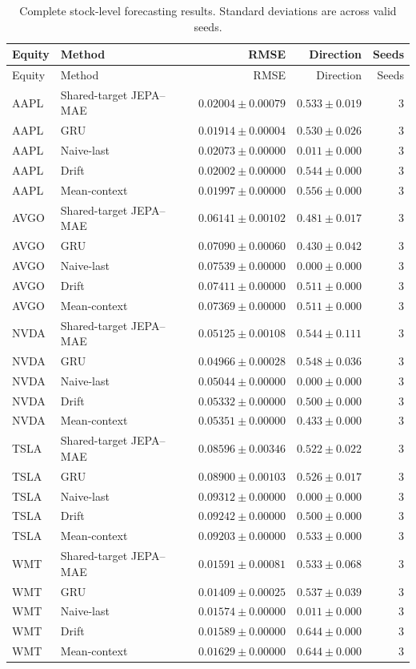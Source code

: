 \begin{longtable}{llrrr}
\caption{Complete stock-level forecasting results. Standard deviations are across valid seeds.}\label{tab:appendix_stock_metrics}\\
\toprule
Equity & Method & RMSE & Direction & Seeds \\
\midrule
\endfirsthead
\toprule
Equity & Method & RMSE & Direction & Seeds \\
\midrule
\endhead
AAPL & Shared-target JEPA--MAE & $0.02004 \pm 0.00079$ & $0.533 \pm 0.019$ & 3 \\
AAPL & GRU & $0.01914 \pm 0.00004$ & $0.530 \pm 0.026$ & 3 \\
AAPL & Naive-last & $0.02073 \pm 0.00000$ & $0.011 \pm 0.000$ & 3 \\
AAPL & Drift & $0.02002 \pm 0.00000$ & $0.544 \pm 0.000$ & 3 \\
AAPL & Mean-context & $0.01997 \pm 0.00000$ & $0.556 \pm 0.000$ & 3 \\
AVGO & Shared-target JEPA--MAE & $0.06141 \pm 0.00102$ & $0.481 \pm 0.017$ & 3 \\
AVGO & GRU & $0.07090 \pm 0.00060$ & $0.430 \pm 0.042$ & 3 \\
AVGO & Naive-last & $0.07539 \pm 0.00000$ & $0.000 \pm 0.000$ & 3 \\
AVGO & Drift & $0.07411 \pm 0.00000$ & $0.511 \pm 0.000$ & 3 \\
AVGO & Mean-context & $0.07369 \pm 0.00000$ & $0.511 \pm 0.000$ & 3 \\
NVDA & Shared-target JEPA--MAE & $0.05125 \pm 0.00108$ & $0.544 \pm 0.111$ & 3 \\
NVDA & GRU & $0.04966 \pm 0.00028$ & $0.548 \pm 0.036$ & 3 \\
NVDA & Naive-last & $0.05044 \pm 0.00000$ & $0.000 \pm 0.000$ & 3 \\
NVDA & Drift & $0.05332 \pm 0.00000$ & $0.500 \pm 0.000$ & 3 \\
NVDA & Mean-context & $0.05351 \pm 0.00000$ & $0.433 \pm 0.000$ & 3 \\
TSLA & Shared-target JEPA--MAE & $0.08596 \pm 0.00346$ & $0.522 \pm 0.022$ & 3 \\
TSLA & GRU & $0.08900 \pm 0.00103$ & $0.526 \pm 0.017$ & 3 \\
TSLA & Naive-last & $0.09312 \pm 0.00000$ & $0.000 \pm 0.000$ & 3 \\
TSLA & Drift & $0.09242 \pm 0.00000$ & $0.500 \pm 0.000$ & 3 \\
TSLA & Mean-context & $0.09203 \pm 0.00000$ & $0.533 \pm 0.000$ & 3 \\
WMT & Shared-target JEPA--MAE & $0.01591 \pm 0.00081$ & $0.533 \pm 0.068$ & 3 \\
WMT & GRU & $0.01409 \pm 0.00025$ & $0.537 \pm 0.039$ & 3 \\
WMT & Naive-last & $0.01574 \pm 0.00000$ & $0.011 \pm 0.000$ & 3 \\
WMT & Drift & $0.01589 \pm 0.00000$ & $0.644 \pm 0.000$ & 3 \\
WMT & Mean-context & $0.01629 \pm 0.00000$ & $0.644 \pm 0.000$ & 3 \\
\bottomrule
\end{longtable}

